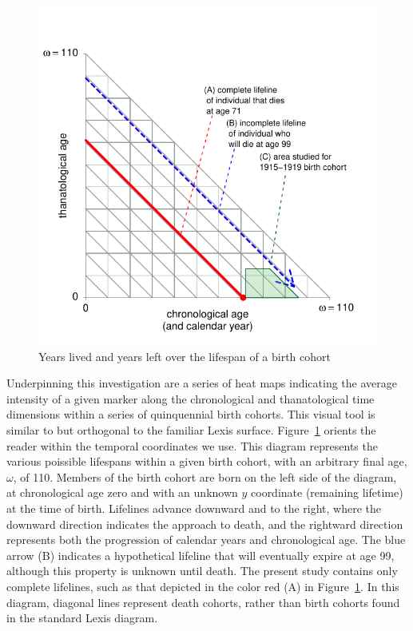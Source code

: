 \documentclass{article}
\begin{document}
\begin{figure}[!h]
\centering
\caption{Years lived and years left over the lifespan of a birth cohort}
\label{fig:LexisOrtho}
	\includegraphics{Figures/LexisOrtho.pdf}
\end{figure}

Underpinning this investigation are a series of heat maps indicating the
average intensity of a given marker along the chronological and thanatological
time dimensions within a series of quinquennial birth cohorts. This visual tool
is similar to but orthogonal to the familiar Lexis surface.
Figure~\ref{fig:LexisOrtho} orients the reader within the temporal coordinates we use. This diagram represents the various poissible lifespans within a given
birth cohort, with an arbitrary final age, $\omega$, of 110.
Members of the birth cohort are born on the left side of the diagram, at
chronological age zero and with an unknown $y$ coordinate (remaining lifetime)
at the time of birth.
Lifelines advance downward and to the right, where the downward direction indicates the approach to death, and the
rightward direction represents both the progression of calendar years and
chronological age. The blue arrow (B) indicates a hypothetical lifeline that
will eventually expire at age 99, although this property is unknown until death. The
present study contains only complete lifelines, such as that depicted in the
color red (A) in Figure~\ref{fig:LexisOrtho}. In this diagram, diagonal lines
represent death cohorts, rather than birth cohorts found in the standard Lexis
diagram.
\end{document}
